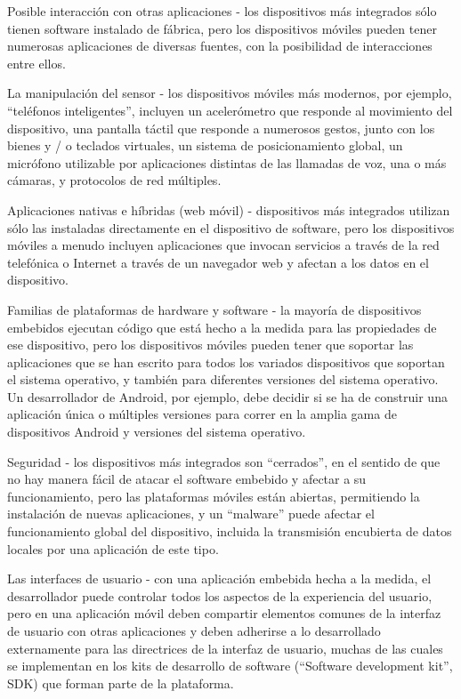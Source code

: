 \begin{enumeracion}
\item Posible interacción con otras aplicaciones - los dispositivos más integrados sólo tienen software instalado de fábrica, pero los dispositivos móviles pueden tener numerosas aplicaciones de diversas fuentes, con la posibilidad de interacciones entre ellos.
\item La manipulación del sensor - los dispositivos móviles más modernos, por ejemplo, ``teléfonos inteligentes'', incluyen un acelerómetro que responde al movimiento del dispositivo, una pantalla táctil que responde a numerosos gestos, junto con los bienes y / o teclados virtuales, un sistema de posicionamiento global, un micrófono utilizable por aplicaciones distintas de las llamadas de voz, una o más cámaras, y protocolos de red múltiples.
\item Aplicaciones nativas e híbridas (web móvil) - dispositivos más integrados utilizan sólo las instaladas directamente en el dispositivo de software, pero los dispositivos móviles a menudo incluyen aplicaciones que invocan servicios a través de la red telefónica o Internet a través de un navegador web y afectan a los datos en el dispositivo.
\item Familias de plataformas de hardware y software - la mayoría de dispositivos embebidos ejecutan código que está hecho a la medida para las propiedades de ese dispositivo, pero los dispositivos móviles pueden tener que soportar las aplicaciones que se han escrito para todos los variados dispositivos que soportan el sistema operativo, y también para diferentes versiones del sistema operativo. Un desarrollador de Android, por ejemplo, debe decidir si se ha de construir una aplicación única o múltiples versiones para correr en la amplia gama de dispositivos Android y versiones del sistema operativo.
\item Seguridad - los dispositivos más integrados son ``cerrados'', en el sentido de que no hay manera fácil de atacar el software embebido y afectar a su funcionamiento, pero las plataformas móviles están abiertas, permitiendo la instalación de nuevas aplicaciones, y un ``malware'' puede afectar el funcionamiento global del dispositivo, incluida la transmisión encubierta de datos locales por una aplicación de este tipo.
\item Las interfaces de usuario - con una aplicación embebida hecha a la medida, el desarrollador puede controlar todos los aspectos de la experiencia del usuario, pero en una aplicación móvil deben compartir elementos comunes de la interfaz de usuario con otras aplicaciones y deben adherirse a lo desarrollado externamente para las directrices de la interfaz de usuario, muchas de las cuales se implementan en los kits de desarrollo de software (``Software development kit'', SDK) que forman parte de la plataforma.

\end{enumeracion}
